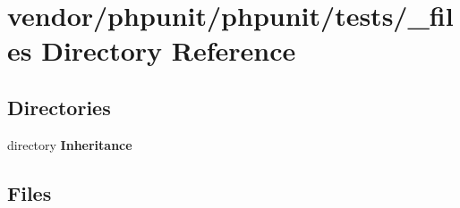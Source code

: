 \section{vendor/phpunit/phpunit/tests/\+\_\+files Directory Reference}
\label{dir_c851d0d211141d967705f21fa6a7b294}
\subsection*{Directories}
\begin{DoxyCompactItemize}
\item 
directory {\bf Inheritance}
\end{DoxyCompactItemize}
\subsection*{Files}
